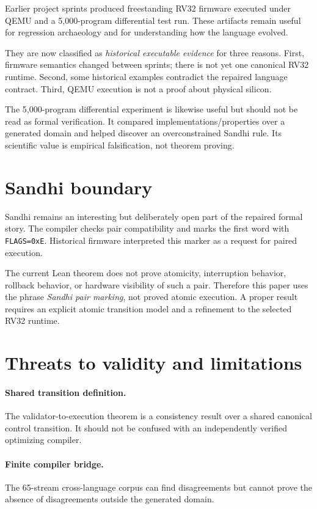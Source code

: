 \documentclass[11pt,a4paper]{article}
\begin{document}
Earlier project sprints produced freestanding RV32 firmware executed under
QEMU and a 5,000-program differential test run. These artifacts remain useful
for regression archaeology and for understanding how the language evolved.

They are now classified as \emph{historical executable evidence} for three
reasons. First, firmware semantics changed between sprints; there is not yet
one canonical RV32 runtime. Second, some historical examples contradict the
repaired language contract. Third, QEMU execution is not a proof about
physical silicon.

The 5,000-program differential experiment is likewise useful but should not
be read as formal verification. It compared implementations/properties over a
generated domain and helped discover an overconstrained Sandhi rule. Its
scientific value is empirical falsification, not theorem proving.

\section{Sandhi boundary}

Sandhi remains an interesting but deliberately open part of the repaired
formal story. The compiler checks pair compatibility and marks the first word
with \texttt{FLAGS=0xE}. Historical firmware interpreted this marker as a
request for paired execution.

The current Lean theorem does not prove atomicity, interruption behavior,
rollback behavior, or hardware visibility of such a pair. Therefore this
paper uses the phrase \emph{Sandhi pair marking}, not proved atomic execution.
A proper result requires an explicit atomic transition model and a refinement
to the selected RV32 runtime.

\section{Threats to validity and limitations}

\paragraph{Shared transition definition.}
The validator-to-execution theorem is a consistency result over a shared
canonical control transition. It should not be confused with an independently
verified optimizing compiler.

\paragraph{Finite compiler bridge.}
The 65-stream cross-language corpus can find disagreements but cannot prove
the absence of disagreements outside the generated domain.
\end{document}
